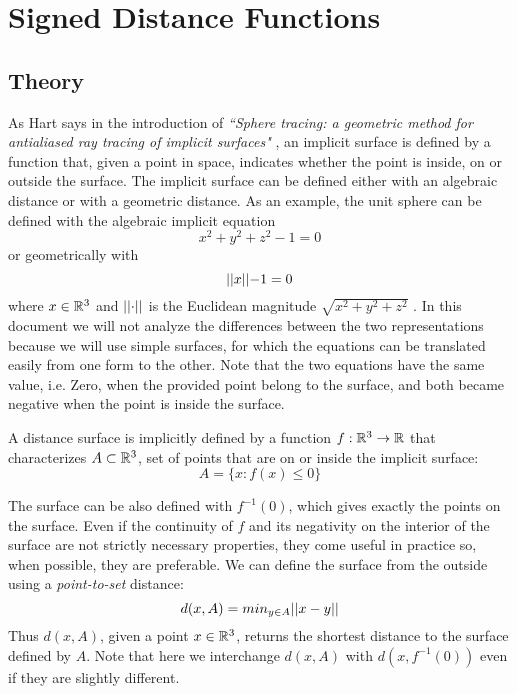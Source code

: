
\section{Signed Distance Functions}
\subsection{Theory}
As Hart says in the introduction of
\emph{``Sphere tracing: a geometric method for antialiased ray tracing of implicit surfaces"}
\cite{hart1996}, an implicit surface is defined by a function that, given a point in space, indicates whether the point is inside, on or outside the surface.
The implicit surface can be defined either with an algebraic distance or with a geometric distance.
As an example, the unit sphere can be defined with the algebraic implicit equation
$$ x^2 + y^2 + z^2 - 1 = 0 $$
or geometrically with
$$ \lvert\lvert x \lvert\lvert - 1= 0 $$
where $x \in \mathbb{R}^3$ and $\lvert\lvert \cdot \lvert\lvert$ is the Euclidean magnitude $\sqrt{x^2 + y^2 + z^2}$
.
In this document we will not analyze the differences between the two representations because we will use simple surfaces, for which the equations can be translated easily from one form to the other.
Note that the two equations have the same value, i.e. Zero, when the provided point belong to the surface, and both became negative when the point is inside the surface.
\begin{definition}
  A distance surface is implicitly defined by a function 
$f : \mathbb{R}^3 \to \mathbb{R}$ that characterizes $A \subset \mathbb{R}^3$, set of points that are on or inside the implicit surface:
$$ A = \{ x: f(x) \leq 0\} $$
\end{definition}
\noindent
The surface can be also defined with $f^{-1}(0)$, which gives exactly the points on the surface.
Even if the continuity of $f$ and its negativity on the interior of the surface are not strictly necessary properties, they come useful in practice so, when possible, they are preferable.
We can define the surface from the outside using a \emph{point-to-set} distance:
$$
d(x,A) = min_{y \in A} \lvert\lvert x - y \lvert\lvert
$$
Thus $d(x,A)$, given a point $x \in \mathbb{R}^3$, returns the shortest distance to the surface defined by $A$.
Note that here we interchange $d(x,A)$ with $d(x, f^{-1}(0))$ even if they are slightly different.
